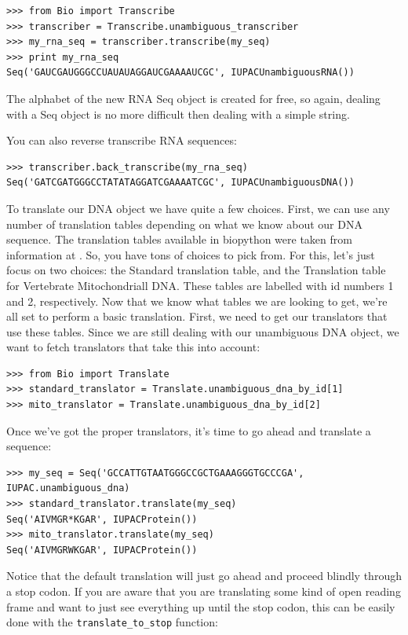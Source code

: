 \documentclass{report}
\begin{document}
\begin{verbatim}
>>> from Bio import Transcribe
>>> transcriber = Transcribe.unambiguous_transcriber
>>> my_rna_seq = transcriber.transcribe(my_seq)
>>> print my_rna_seq
Seq('GAUCGAUGGGCCUAUAUAGGAUCGAAAAUCGC', IUPACUnambiguousRNA())
\end{verbatim}

The alphabet of the new RNA Seq object is created for free, so again, dealing with a Seq object is no more difficult then dealing with a simple string.


You can also reverse transcribe RNA sequences:

\begin{verbatim}
>>> transcriber.back_transcribe(my_rna_seq)
Seq('GATCGATGGGCCTATATAGGATCGAAAATCGC', IUPACUnambiguousDNA())
\end{verbatim}


To translate our DNA object we have quite a few choices. First, we can use any number of translation tables depending on what we know about our DNA sequence. The translation tables available in biopython were taken from information at . So, you have tons of choices to pick from. For this, let's just focus on two choices: the Standard translation table, and the Translation table for Vertebrate Mitochondriall DNA. These tables are labelled with id numbers 1 and 2, respectively. Now that we know what tables we are looking to get, we're all set to perform a basic translation. First, we need to get our translators that use these tables. Since we are still dealing with our unambiguous DNA object, we want to fetch translators that take this into account:

\begin{verbatim}
>>> from Bio import Translate
>>> standard_translator = Translate.unambiguous_dna_by_id[1] 
>>> mito_translator = Translate.unambiguous_dna_by_id[2]
\end{verbatim}

Once we've got the proper translators, it's time to go ahead and translate a sequence:

\begin{verbatim}
>>> my_seq = Seq('GCCATTGTAATGGGCCGCTGAAAGGGTGCCCGA', IUPAC.unambiguous_dna)
>>> standard_translator.translate(my_seq)
Seq('AIVMGR*KGAR', IUPACProtein())
>>> mito_translator.translate(my_seq)
Seq('AIVMGRWKGAR', IUPACProtein())
\end{verbatim}

Notice that the default translation will just go ahead and proceed blindly through a stop codon. If you are aware that you are translating some kind of open reading frame and want to just see everything up until the stop codon, this can be easily done with the \verb|translate_to_stop| function:
\end{document}
